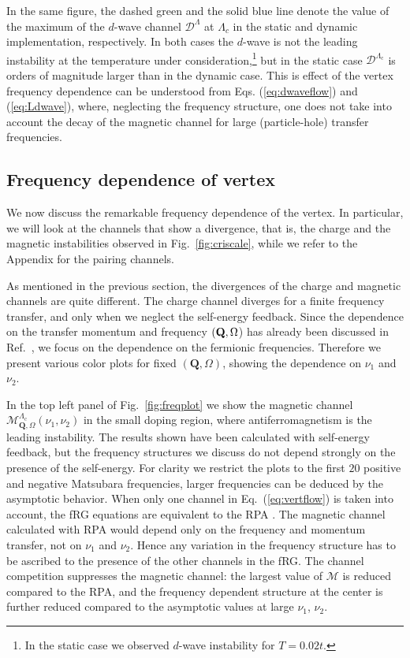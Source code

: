 In the same figure, the dashed green and the solid blue line denote the value of the maximum of the $d$-wave channel $\mathcal{D}^\Lambda$ at $\Lambda_c$ in the static and dynamic implementation, respectively.
In both cases the $d$-wave is not the leading instability at the temperature under consideration,\footnote{In the static case we observed $d$-wave instability for $T=0.02t$. } but in the static case $\mathcal{D}^{\Lambda_{\mathrm{c}}}$ is orders of magnitude larger than in the dynamic case. 
This is effect of the vertex frequency dependence can be understood from Eqs. (\ref{eq:dwaveflow}) and (\ref{eq:Ldwave}), where, neglecting the frequency structure, one does not take into account the decay of the magnetic channel for large (particle-hole) transfer frequencies.



\subsection{Frequency dependence of vertex}

We now discuss the remarkable frequency dependence of the vertex. 
In particular, we will look at the channels that show a divergence, that is, the charge and the magnetic instabilities observed in Fig.~\ref{fig:criscale}, while we refer to the Appendix for the pairing channels.

As mentioned in the previous section, the divergences of the charge and magnetic channels are quite different. The charge channel diverges for a finite frequency transfer, and only when we neglect the self-energy feedback. 
Since the dependence on the transfer momentum and frequency $(\mathbf{Q},\Omega$) has already been discussed in Ref.~, we focus on the dependence on the fermionic frequencies. Therefore we present various color plots for fixed  $(\mathbf{Q},\Omega)$, showing the dependence on $\nu_1$ and $\nu_2$. 
 
In the top left panel of Fig.~\ref{fig:freqplot} we show the magnetic channel $\mathcal{M}^{\Lambda_\mathrm{c}}_{\mathbf{Q},\Omega}(\nu_1,\nu_2)$ in the small doping region, where antiferromagnetism is the leading instability. 
The results shown have been calculated with self-energy feedback, but the frequency structures we discuss do not depend strongly on the presence of the self-energy. 
For clarity we restrict the plots to the first $20$ positive and negative Matsubara frequencies, larger frequencies can be deduced by the asymptotic behavior.\cite{Wentzell2016a}
When only one channel in Eq.~(\ref{eq:vertflow}) is taken into account, the fRG equations are equivalent to the RPA . 
The magnetic channel calculated with RPA would depend only on the frequency and momentum transfer, not on $\nu_1$ and $\nu_2$.
Hence any variation in the frequency structure has to be ascribed to the presence of the other channels in the fRG.
The channel competition suppresses the magnetic channel: the largest value of $\mathcal{M}$ is reduced compared to the RPA, and the frequency dependent structure at the center is further reduced compared to the asymptotic values at large $\nu_1$, $\nu_2$. 

